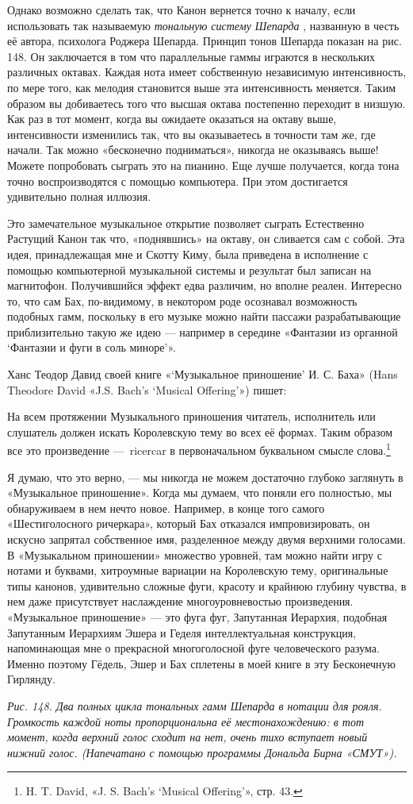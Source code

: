 \documentclass[../main.tex]{subfiles}
\begin{document}
Однако возможно сделать так, что Канон вернется точно к началу, если использовать так называемую \emph{тональную систему Шепарда} , названную в честь её автора, психолога Роджера Шепарда. Принцип тонов Шепарда показан на рис. 148. Он заключается в том что параллельные гаммы играются в нескольких различных октавах. Каждая нота имеет собственную независимую интенсивность, по мере того, как мелодия становится выше эта интенсивность меняется. Таким образом вы добиваетесь того что высшая октава постепенно переходит в низшую. Как раз в тот момент, когда вы ожидаете оказаться на октаву выше, интенсивности изменились так, что вы оказываетесь в точности там же, где начали. Так можно «бесконечно подниматься», никогда не оказываясь выше! Можете попробовать сыграть это на пианино. Еще лучше получается, когда тона точно воспроизводятся с помощью компьютера. При этом достигается удивительно полная иллюзия.

Это замечательное музыкальное открытие позволяет сыграть Естественно Растущий Канон так что, «поднявшись» на октаву, он сливается сам с собой. Эта идея, принадлежащая мне и Скотту Киму, была приведена в исполнение с помощью компьютерной музыкальной системы и результат был записан на магнитофон. Получившийся эффект едва различим, но вполне реален. Интересно то, что сам Бах, по-видимому, в некотором роде осознавал возможность подобных гамм, поскольку в его музыке можно найти пассажи разрабатывающие приблизительно такую же идею --- например в середине «Фантазии из органной \enquote*{Фантазии и фуги в соль миноре}».

Ханс Теодор Давид своей книге «\enquote*{Музыкальное приношение} И. С. Баха» (Hans Theodore David «J.S. Bach's \enquote*{Musical Offering}») пишет:

На всем протяжении Музыкального приношения читатель, исполнитель или слушатель должен искать Королевскую тему во всех её формах. Таким образом все это произведение ---~ricercar в первоначальном буквальном смысле слова.\footnote{H. T. David, «J. S. Bach's \enquote*{Musical Offering}», стр. 43.}

Я думаю, что это верно, --- мы никогда не можем достаточно глубоко заглянуть в «Музыкальное приношение». Когда мы думаем, что поняли его полностью, мы обнаруживаем в нем нечто новое. Например, в конце того самого «Шестиголосного ричеркара», который Бах отказался импровизировать, он искусно запрятал собственное имя, разделенное между двумя верхними голосами. В «Музыкальном приношении» множество уровней, там можно найти игру с нотами и буквами, хитроумные вариации на Королевскую тему, оригинальные типы канонов, удивительно сложные фуги, красоту и крайнюю глубину чувства, в нем даже присутствует наслаждение многоуровневостью произведения. «Музыкальное приношение» --- это фуга фуг, Запутанная Иерархия, подобная Запутанным Иерархиям Эшера и Геделя интеллектуальная конструкция, напоминающая мне о прекрасной многоголосной фуге человеческого разума. Именно поэтому Гёдель, Эшер и Бах сплетены в моей книге в эту Бесконечную Гирлянду.

\emph{Рис. 148. Два полных цикла тональных гамм Шепарда в нотации для рояля. Громкость каждой ноты пропорциональна её местонахождению: в тот момент, когда верхний голос сходит на нет, очень тихо вступает новый нижний голос. (Напечатано с помощью программы Дональда Бирна «СМУТ»).}
\end{document}
